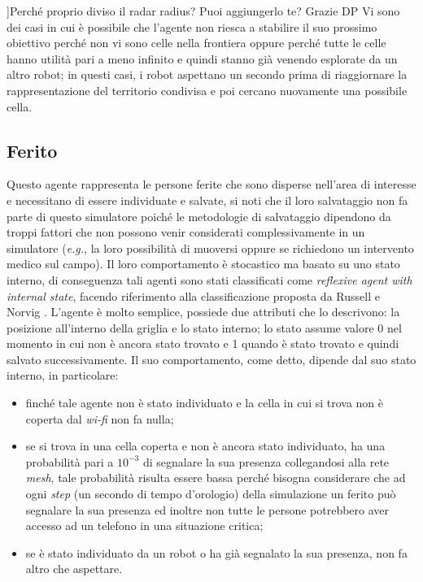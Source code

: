 \todo[inline]]{Perché proprio diviso il radar radius? Puoi aggiungerlo te? Grazie DP}
Vi sono dei casi in cui è possibile che l'agente non riesca a stabilire il suo prossimo obiettivo perché non vi sono celle nella frontiera oppure perché tutte le celle hanno utilità pari a meno infinito e quindi stanno già venendo esplorate da un altro robot; in questi casi, i robot aspettano un secondo prima di riaggiornare la rappresentazione del territorio condivisa e poi cercano nuovamente una possibile cella.
\subsection{Ferito}
Questo agente rappresenta le persone ferite che sono disperse nell'area di interesse e necessitano di essere individuate e salvate, si noti che il loro salvataggio non fa parte di questo simulatore poiché le metodologie di salvataggio dipendono da troppi fattori che non possono venir considerati complessivamente in un simulatore (\textit{e.g.}, la loro possibilità di muoversi oppure se richiedono un intervento medico sul campo).
Il loro comportamento è stocastico ma basato su uno stato interno, di conseguenza tali agenti sono stati classificati come \textit{reflexive agent with internal state}, facendo riferimento alla classificazione proposta da Russell e Norvig \cite{russell2016}.
L'agente è molto semplice, possiede due attributi che lo descrivono: la posizione all'interno della griglia e lo stato interno; lo stato assume valore 0 nel momento in cui non è ancora stato trovato e 1 quando è stato trovato e quindi salvato successivamente.
Il suo comportamento, come detto, dipende dal suo stato interno, in particolare: 
\begin{itemize}
	\item finché tale agente non è stato individuato e la cella in cui si trova non è coperta dal \textit{wi-fi} non fa nulla;
	\item se si trova in una cella coperta e non è ancora stato individuato, ha una probabilità pari a $10^{-3}$ di segnalare la sua presenza collegandosi alla rete \textit{mesh}, tale probabilità risulta essere bassa perché bisogna considerare che ad ogni \textit{step} (un secondo di tempo d'orologio) della simulazione un ferito può segnalare la sua presenza ed inoltre non tutte le persone potrebbero aver accesso ad un telefono in una situazione critica;
	\item se è stato individuato da un robot o ha già segnalato la sua presenza, non fa altro che aspettare.
\end{itemize}
